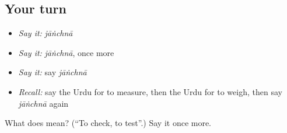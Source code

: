 \subsection*{Your turn}
\begin{itemize}
\raggedright
  \item \emph{Say it:} \emph{jāṅchnā}
  \item \emph{Say it:} \emph{jāṅchnā}, once more
  \item \emph{Say it:} say \emph{jāṅchnā}
  \item \emph{Recall:} say the Urdu for to measure, then the Urdu for to weigh, then say \emph{jāṅchnā} again
\end{itemize}

\begin{tcolorbox}[breakable,colback=teal!4,colframe=teal!35!black,title={Before you move on}]
What does  mean? (\textquotedblleft{}To check, to test\textquotedblright{}.) Say it once more.
\end{tcolorbox}
